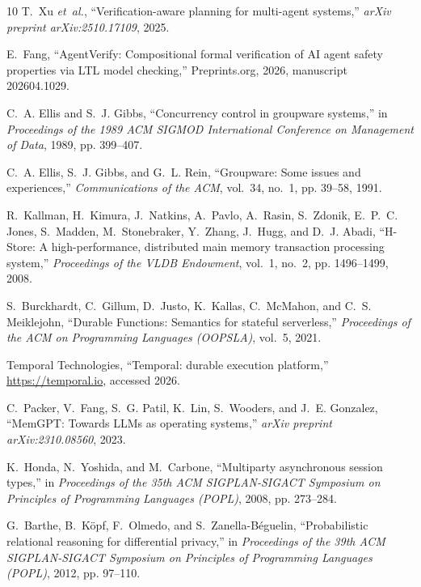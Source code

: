 \documentclass[journal,compsoc,10pt]{IEEEtran}
\theoremstyle{definition}
\theoremstyle{remark}
\begin{document}
\begin{thebibliography}{10}
T.~Xu \emph{et~al.}, ``Verification-aware planning for multi-agent systems,''
  \emph{arXiv preprint arXiv:2510.17109}, 2025.

E.~Fang, ``{AgentVerify}: Compositional formal verification of {AI} agent
  safety properties via {LTL} model checking,'' Preprints.org, 2026, manuscript
  202604.1029.

C.~A. Ellis and S.~J. Gibbs, ``Concurrency control in groupware systems,'' in
  \emph{Proceedings of the 1989 ACM SIGMOD International Conference on
  Management of Data}, 1989, pp. 399--407.

C.~A. Ellis, S.~J. Gibbs, and G.~L. Rein, ``Groupware: Some issues and
  experiences,'' \emph{Communications of the ACM}, vol.~34, no.~1, pp. 39--58,
  1991.

R.~Kallman, H.~Kimura, J.~Natkins, A.~Pavlo, A.~Rasin, S.~Zdonik, E.~P.~C.
  Jones, S.~Madden, M.~Stonebraker, Y.~Zhang, J.~Hugg, and D.~J. Abadi,
  ``{H-Store}: A high-performance, distributed main memory transaction
  processing system,'' \emph{Proceedings of the VLDB Endowment}, vol.~1, no.~2,
  pp. 1496--1499, 2008.

S.~Burckhardt, C.~Gillum, D.~Justo, K.~Kallas, C.~McMahon, and C.~S.
  Meiklejohn, ``Durable Functions: Semantics for stateful serverless,''
  \emph{Proceedings of the ACM on Programming Languages (OOPSLA)},
  vol.~5, 2021.

{Temporal Technologies}, ``Temporal: durable execution platform,''
  \url{https://temporal.io}, accessed 2026.

C.~Packer, V.~Fang, S.~G. Patil, K.~Lin, S.~Wooders, and J.~E. Gonzalez,
  ``{MemGPT}: Towards {LLMs} as operating systems,'' \emph{arXiv preprint
  arXiv:2310.08560}, 2023.

K.~Honda, N.~Yoshida, and M.~Carbone, ``Multiparty asynchronous session
  types,'' in \emph{Proceedings of the 35th ACM SIGPLAN-SIGACT Symposium on
  Principles of Programming Languages (POPL)}, 2008, pp. 273--284.

G.~Barthe, B.~K{\"o}pf, F.~Olmedo, and S.~Zanella-B{\'e}guelin,
  ``Probabilistic relational reasoning for differential privacy,'' in
  \emph{Proceedings of the 39th ACM SIGPLAN-SIGACT Symposium on Principles
  of Programming Languages (POPL)}, 2012, pp. 97--110.


\end{thebibliography}
\end{document}
